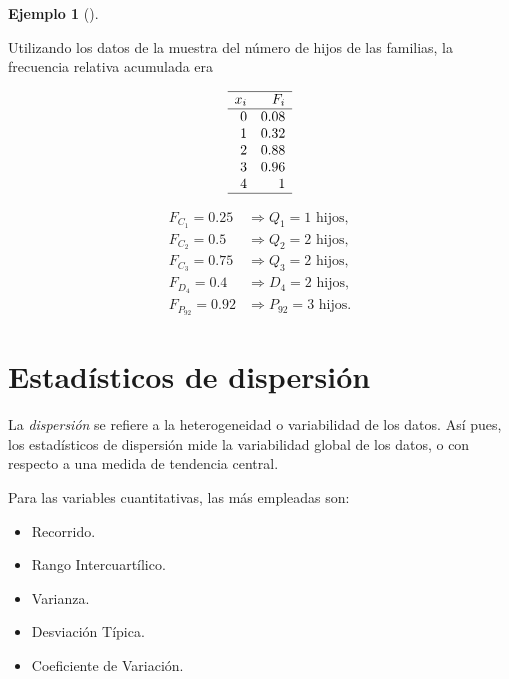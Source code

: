 \documentclass[
  spanish,
  a4paper,
]{scrreport}
\providecommand{\tightlist}{%
  \setlength{\itemsep}{0pt}\setlength{\parskip}{0pt}}
\theoremstyle{plain}
\theoremstyle{definition}
\newtheorem{example}{Ejemplo}[chapter]
\theoremstyle{definition}
\theoremstyle{remark}
\begin{document}
\begin{example}[]\protect\hypertarget{exm-cuantiles-datos-no-agrupados}{}\label{exm-cuantiles-datos-no-agrupados}

Utilizando los datos de la muestra del número de hijos de las familias,
la frecuencia relativa acumulada era

\[
\begin{array}{rr}
\hline
x_i & F_i \\
\hline
0 & 0.08\\
1 & 0.32\\
2 & 0.88\\
3 & 0.96\\
4 & 1\\
\hline
\end{array}
\]

\begin{align*}
F_{C_1}=0.25 &\Rightarrow Q_1 = 1 \text{ hijos},\\
F_{C_2}=0.5 &\Rightarrow Q_2 = 2 \text{ hijos},\\
F_{C_3}=0.75 &\Rightarrow Q_3 = 2 \text{ hijos},\\
F_{D_4}=0.4 &\Rightarrow D_4 = 2 \text{ hijos},\\
F_{P_{92}}=0.92 &\Rightarrow P_{92} = 3 \text{ hijos}.
\end{align*}

\end{example}

\section{Estadísticos de
dispersión}\label{estaduxedsticos-de-dispersiuxf3n}

La \emph{dispersión} se refiere a la heterogeneidad o variabilidad de
los datos. Así pues, los estadísticos de dispersión mide la variabilidad
global de los datos, o con respecto a una medida de tendencia central.

Para las variables cuantitativas, las más empleadas son:

\begin{itemize}
\tightlist
\item
  Recorrido.
\item
  Rango Intercuartílico.
\item
  Varianza.
\item
  Desviación Típica.
\item
  Coeficiente de Variación.
\end{itemize}
\end{document}
